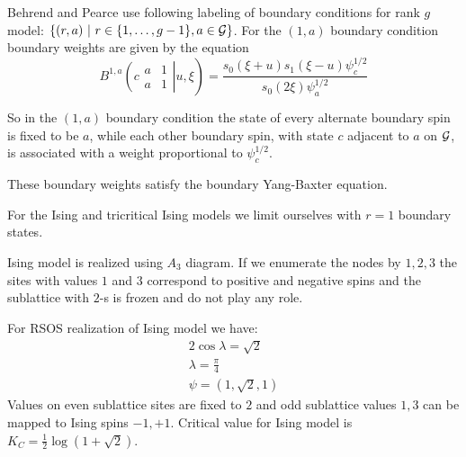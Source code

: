 \documentclass[12pt]{article}
\begin{document}
Behrend and Pearce use following labeling of boundary conditions for
rank $g$ model:
$\left\{(r,a)\ |\ r\in\{1,\dots,g-1\}, a\in {\cal G}\right\}$. For the
$(1,a)$ boundary condition boundary weights are given by the equation
\begin{equation}
  \label{eq:8}
  B^{1,a}\left.\left( c
    \begin{array}{ll}
      a & 1\\
      a & 1
    \end{array}\right| u, \xi \right)= \frac{s_0(\xi+u) s_1(\xi-u)
  \psi^{1/2}_c } {s_0(2\xi) \psi_a^{1/2}}
\end{equation}

So in the $(1, a)$ boundary condition the state of every alternate
boundary spin is fixed to be $a$, while each other boundary spin,
with state $c$ adjacent to $a$ on ${\cal G}$, is associated with a
weight proportional to $\psi_c^{1/2}$. 

These boundary weights satisfy the boundary Yang-Baxter equation.

For the Ising and tricritical Ising models we limit ourselves with $r=1$
boundary states. 


Ising model is realized using $A_{3}$ diagram. If we enumerate the nodes by $1,2,3$ the sites with
values $1$ and $3$ correspond to positive and negative spins and the sublattice with $2$-s is frozen
and do not play any role. 

For RSOS realization of Ising model we have:
\begin{eqnarray}
  \label{eq:10}
  2 \cos\lambda = \sqrt{2}\\
  \lambda=\frac{\pi}{4}\\
  \psi = (1,\sqrt{2},1)
\end{eqnarray}
Values on even sublattice sites are fixed to $2$ and odd sublattice
values $1,3$ can be mapped to Ising spins $-1,+1$. Critical value for
Ising model is $K_C=\frac{1}{2}\log (1+\sqrt{2})$.
\end{document}
